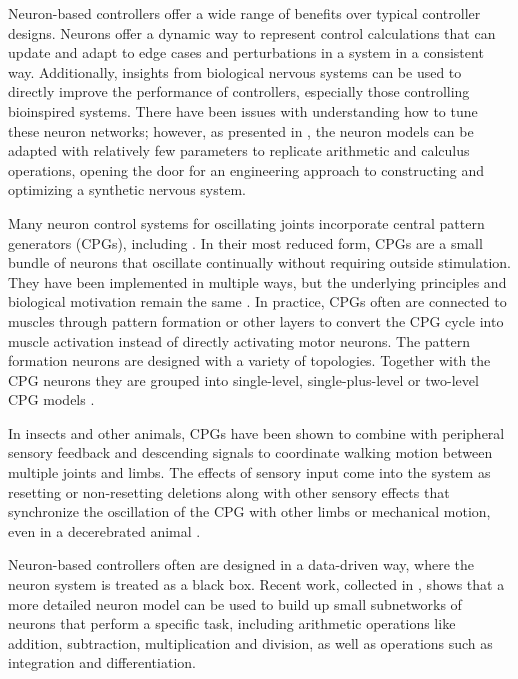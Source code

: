 
Neuron-based controllers offer a wide range of benefits over typical controller
designs. Neurons offer a dynamic way to represent control calculations that can
update and adapt to edge cases and perturbations in a system in a consistent 
way. Additionally, insights from biological nervous systems can be used to 
directly improve the performance of controllers, especially those controlling 
bioinspired systems. There have been issues with understanding how
to tune these neuron networks; however, as presented in 
\cite{NickFunctionalSubnetwork}, the neuron models can be adapted with 
relatively few parameters to replicate arithmetic and calculus operations, 
opening the door for an engineering approach to constructing and optimizing a synthetic nervous system.


Many neuron control systems for oscillating joints incorporate central pattern
generators (CPGs), including 
\cite{Narioka2012, EventBasedWalking, HuntHindLegWalking, HuntPhDThesis}.
In their most reduced form, CPGs are a small bundle of
neurons that oscillate continually without requiring outside stimulation. They
have been implemented in multiple ways, but the underlying principles and 
biological motivation remain the same \cite{CPGReview}.
In
practice, CPGs often are connected to muscles through pattern formation or other
layers to convert the CPG cycle into muscle activation instead of directly
activating motor neurons. The pattern formation neurons are designed with a variety of topologies. Together with the CPG neurons they are grouped into single-level,
single-plus-level or two-level CPG models \cite{MultiLevelCPG}.

In insects and other animals, CPGs have been shown to combine with peripheral 
sensory feedback and
descending signals to coordinate walking motion between multiple joints and
limbs. The effects of sensory input come into the system as resetting or non-resetting deletions
along with other sensory effects that synchronize the oscillation of the CPG
with other limbs or mechanical motion, even in a decerebrated animal
\cite{SixLeggedWalking, CPGReview}.


Neuron-based controllers often are designed in a data-driven way, where the
neuron system is treated as a black box. Recent work, collected in 
\cite{NickFunctionalSubnetwork}, shows that a more detailed neuron model can be
used to build up small subnetworks of neurons that perform a specific task,
including arithmetic operations like addition, subtraction, multiplication and
division, as well as operations such as integration and differentiation.

